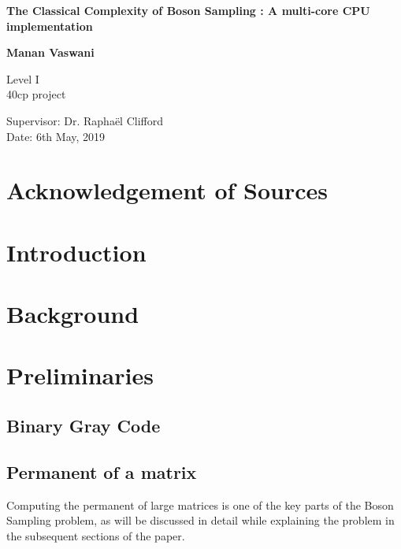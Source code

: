 \documentclass[11pt]{article}
\theoremstyle{theorem}
\theoremstyle{remark}
\theoremstyle{plain}
\theoremstyle{definition}
\begin{document}
\begin{titlepage}
    \begin{center}
        \vspace*{\fill}
        
        \Huge
        \textbf{The Classical Complexity of Boson Sampling : A multi-core CPU implementation}
        
        \LARGE
        
        \vspace{2cm}
        \textbf{Manan Vaswani}
        
        \vfill
        
        Level I\\
        40cp project
        
        \vspace{0.8cm}
        
        
        \Large
        Supervisor: Dr. Rapha\"el Clifford\\
	Date: 6th May, 2019
        
    \end{center}
\end{titlepage}

\newpage
\section*{Acknowledgement of Sources}

\newpage
\tableofcontents
\newpage
\section{Introduction} %


\section{Background} %

\section{Preliminaries}
\subsection{Binary Gray Code} \label{sec:gray_code}

\subsection{Permanent of a matrix} \label{sec:permanent}
Computing the permanent of large matrices is one of the key parts of the Boson Sampling problem, as will be discussed in detail while explaining the problem in the subsequent sections of the paper.
\end{document}
